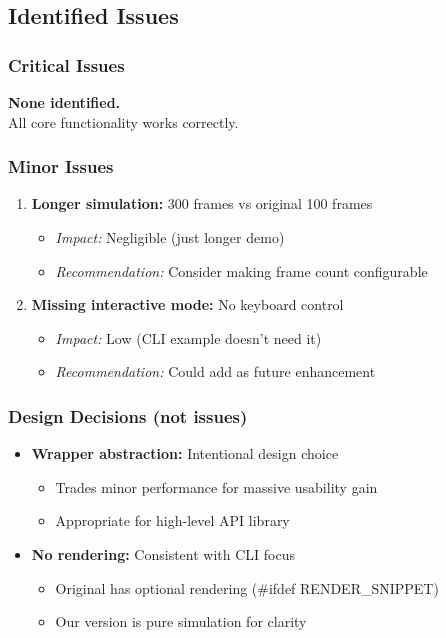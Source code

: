 \subsection{Identified Issues}

\subsubsection{Critical Issues}
\textbf{None identified.} \\
All core functionality works correctly.

\subsubsection{Minor Issues}
\begin{enumerate}
    \item \textbf{Longer simulation:} 300 frames vs original 100 frames
    \begin{itemize}
        \item \textit{Impact:} Negligible (just longer demo)
        \item \textit{Recommendation:} Consider making frame count configurable
    \end{itemize}

    \item \textbf{Missing interactive mode:} No keyboard control
    \begin{itemize}
        \item \textit{Impact:} Low (CLI example doesn't need it)
        \item \textit{Recommendation:} Could add as future enhancement
    \end{itemize}
\end{enumerate}

\subsubsection{Design Decisions (not issues)}
\begin{itemize}
    \item \textbf{Wrapper abstraction:} Intentional design choice
    \begin{itemize}
        \item Trades minor performance for massive usability gain
        \item Appropriate for high-level API library
    \end{itemize}

    \item \textbf{No rendering:} Consistent with CLI focus
    \begin{itemize}
        \item Original has optional rendering (#ifdef RENDER\_SNIPPET)
        \item Our version is pure simulation for clarity
    \end{itemize}
\end{itemize}

